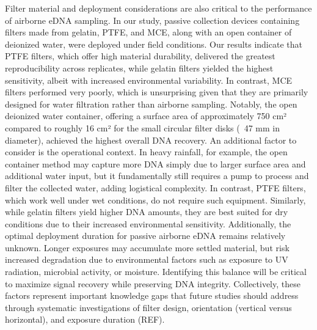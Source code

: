 \documentclass{article}
\begin{document}
Filter material and deployment considerations are also critical to the performance of airborne eDNA sampling. In our study, passive collection devices containing filters made from gelatin, PTFE, and MCE, along with an open container of deionized water, were deployed under field conditions. Our results indicate that PTFE filters, which offer high material durability, delivered the greatest reproducibility across replicates, while gelatin filters yielded the highest sensitivity, albeit with increased environmental variability. In contrast, MCE filters performed very poorly, which is unsurprising given that they are primarily designed for water filtration rather than airborne sampling. Notably, the open deionized water container, offering a surface area of approximately 750 cm² compared to roughly 16 cm² for the small circular filter disks (~47 mm in diameter), achieved the highest overall DNA recovery. An additional factor to consider is the operational context. In heavy rainfall, for example, the open container method may capture more DNA simply due to larger surface area and additional water input, but it fundamentally still requires a pump to process and filter the collected water, adding logistical complexity. In contrast, PTFE filters, which work well under wet conditions, do not require such equipment. Similarly, while gelatin filters yield higher DNA amounts, they are best suited for dry conditions due to their increased environmental sensitivity. Additionally, the optimal deployment duration for passive airborne eDNA remains relatively unknown. Longer exposures may accumulate more settled material, but risk increased degradation due to environmental factors such as exposure to UV radiation, microbial activity, or moisture. Identifying this balance will be critical to maximize signal recovery while preserving DNA integrity. Collectively, these factors represent important knowledge gaps that future studies should address through systematic investigations of filter design, orientation (vertical versus horizontal), and exposure duration (REF).
\end{document}
